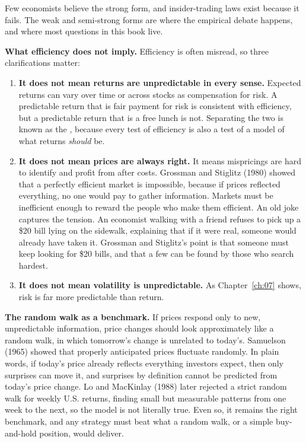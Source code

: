 Few economists believe the strong form, and insider-trading laws exist because it fails. The weak and semi-strong forms are where the empirical debate happens, and where most questions in this book live.

\textbf{What efficiency does not imply.} Efficiency is often misread, so three clarifications matter:

\begin{enumerate}
  \item \textbf{It does not mean returns are unpredictable in every sense.} Expected returns can vary over time or across stocks as compensation for risk. A predictable return that is fair payment for risk is consistent with efficiency, but a predictable return that is a free lunch is not. Separating the two is known as the , because every test of efficiency is also a test of a model of what returns \emph{should} be.
  \item \textbf{It does not mean prices are always right.} It means mispricings are hard to identify and profit from after costs. Grossman and Stiglitz (1980) showed that a perfectly efficient market is impossible, because if prices reflected everything, no one would pay to gather information. Markets must be inefficient enough to reward the people who make them efficient. An old joke captures the tension. An economist walking with a friend refuses to pick up a \$20 bill lying on the sidewalk, explaining that if it were real, someone would already have taken it. Grossman and Stiglitz's point is that someone must keep looking for \$20 bills, and that a few can be found by those who search hardest.
  \item \textbf{It does not mean volatility is unpredictable.} As Chapter~\ref{ch:07} shows, risk is far more predictable than return.
\end{enumerate}

\textbf{The random walk as a benchmark.} If prices respond only to new, unpredictable information, price changes should look approximately like a random walk, in which tomorrow's change is unrelated to today's. Samuelson (1965) showed that properly anticipated prices fluctuate randomly. In plain words, if today's price already reflects everything investors expect, then only surprises can move it, and surprises by definition cannot be predicted from today's price change. Lo and MacKinlay (1988) later rejected a strict random walk for weekly U.S. returns, finding small but measurable patterns from one week to the next, so the model is not literally true. Even so, it remains the right benchmark, and any strategy must beat what a random walk, or a simple buy-and-hold position, would deliver.

